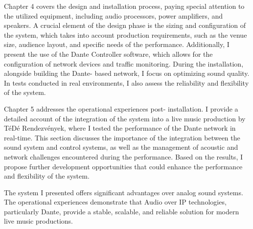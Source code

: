 Chapter 4 covers the design and installation process, 
paying special attention to the utilized equipment, 
including audio processors, power amplifiers, and 
speakers. A crucial element of the design phase is 
the sizing and configuration of the system, which 
takes into account production requirements, such as 
the venue size, audience layout, and specific needs 
of the performance. Additionally, I present the use of 
the Dante Controller software, which allows for the 
configuration of network devices and traffic monitoring. 
During the installation, alongside building the Dante- 
based network, I focus on optimizing sound quality. 
In tests conducted in real environments, I also assess 
the reliability and flexibility of the system.

Chapter 5 addresses the operational experiences post- 
installation. I provide a detailed account of the 
integration of the system into a live music production 
by TéDé Rendezvények, where I tested the performance 
of the Dante network in real-time. This section discusses 
the importance of the integration between the sound 
system and control systems, as well as the management 
of acoustic and network challenges encountered during 
the performance. Based on the results, I propose further 
development opportunities that could enhance the 
performance and flexibility of the system.

The system I presented offers significant advantages 
over analog sound systems. The operational experiences 
demonstrate that Audio over IP technologies, particularly 
Dante, provide a stable, scalable, and reliable solution 
for modern live music productions.





\vfill
\selectthesislanguage

\setcounter{romanPage}{\value{page}}

